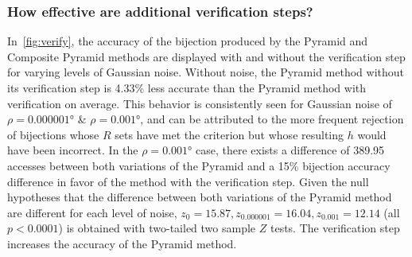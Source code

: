 \subsubsection{How effective are additional verification steps?}
%
%
%
%
%
%

In~\autoref{fig:verify}, the accuracy of the bijection produced by the Pyramid and Composite Pyramid methods are
displayed with and without the verification step for varying levels of Gaussian noise.
Without noise, the Pyramid method without its verification step is 4.33\% less accurate than the Pyramid method with
verification on average.
This behavior is consistently seen for Gaussian noise of $\rho=\ang{0.000001}$ \& $\rho=\ang{0.001}$, and
can be attributed to the more frequent rejection of bijections whose $R$ sets have met the criterion but whose resulting
$h$ would have been incorrect.
In the $\rho=\ang{0.001}$ case, there exists a difference of 389.95 accesses between both variations of the Pyramid
and a 15\% bijection accuracy difference in favor of the method with the verification step.
Given the null hypotheses that the difference between both variations of the Pyramid method are different for each level
of noise, $z_0 = 15.87, z_{0.000001} = 16.04, z_{0.001} = 12.14$ (all $p < 0.0001$) is obtained with two-tailed two
sample $Z$ tests.
The verification step increases the accuracy of the Pyramid method.

